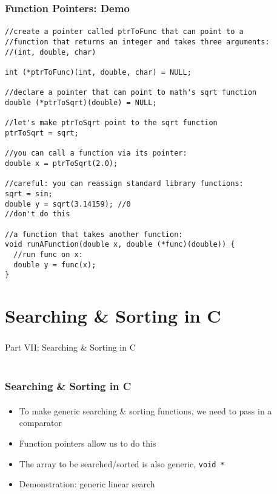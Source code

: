 \documentclass[]{beamer}
\begin{document}
\begin{frame}[fragile]
  \frametitle{Function Pointers: Demo}
  \framesubtitle{}

\begin{verbatim}
//create a pointer called ptrToFunc that can point to a
//function that returns an integer and takes three arguments:
//(int, double, char)

int (*ptrToFunc)(int, double, char) = NULL;

//declare a pointer that can point to math's sqrt function
double (*ptrToSqrt)(double) = NULL;

//let's make ptrToSqrt point to the sqrt function
ptrToSqrt = sqrt;

//you can call a function via its pointer:
double x = ptrToSqrt(2.0);

//careful: you can reassign standard library functions:
sqrt = sin;
double y = sqrt(3.14159); //0
//don't do this

//a function that takes another function:
void runAFunction(double x, double (*func)(double)) {
  //run func on x:
  double y = func(x);  
}
\end{verbatim}
\end{frame}

\section{Searching \& Sorting in C}

\begin{frame}
    \frametitle{}
    \framesubtitle{}
    
    \begin{center}
    {\Huge Part VII: Searching \& Sorting in C}\\
    {\Large ~}
    \end{center}

\end{frame}

\begin{frame}[fragile]
  \frametitle{Searching \& Sorting in C}
  \framesubtitle{}

\begin{itemize}[<+->]
  \item To make generic searching \& sorting functions, we need to pass in a comparator
  \item Function pointers allow us to do this
  \item The array to be searched/sorted is also generic, \texttt{void *}
  \item Demonstration: generic linear search 
\end{itemize}

\end{frame}
\end{document}
